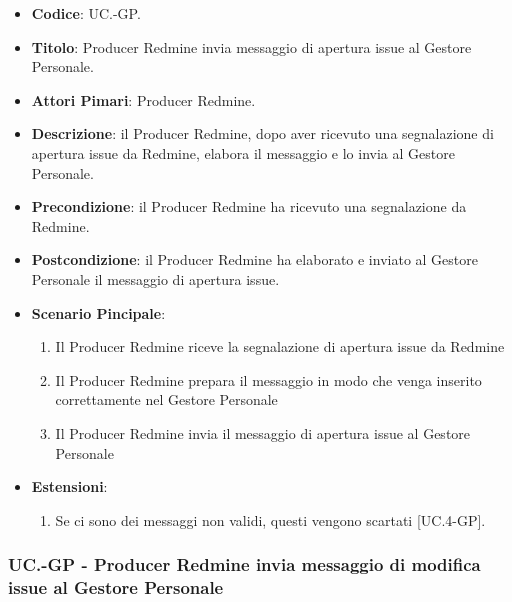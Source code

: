 	\begin{itemize}
		\item \textbf{Codice}: UC\theuccount.\thesubuccount-GP.
		\item \textbf{Titolo}: Producer Redmine invia messaggio di apertura issue al Gestore Personale.
		\item \textbf{Attori Pimari}: Producer Redmine.
		\item \textbf{Descrizione}: il Producer Redmine, dopo aver
		ricevuto una segnalazione di apertura issue da Redmine, elabora il messaggio e lo invia al Gestore Personale.
		\item \textbf{Precondizione}: il Producer Redmine ha ricevuto una segnalazione da Redmine.
		\item \textbf{Postcondizione}: il Producer Redmine ha elaborato e inviato al Gestore Personale il messaggio di apertura issue.
		\item \textbf{Scenario Pincipale}: 
		\begin{enumerate}
			\item Il Producer Redmine riceve la segnalazione di apertura issue da Redmine
			\item Il Producer Redmine prepara il messaggio in modo che venga inserito correttamente nel Gestore Personale
			\item Il Producer Redmine invia il messaggio di
			apertura issue al Gestore Personale
		\end{enumerate}
		\item \textbf{Estensioni}: 
		\begin{enumerate}
			\item Se ci sono dei messaggi non validi, questi vengono scartati [UC\theuccount.4-GP].
		\end{enumerate}
	\end{itemize}
	
	\subsubsection{UC\theuccount.\thesubuccount-GP - Producer Redmine invia messaggio di modifica issue al Gestore Personale}
		
